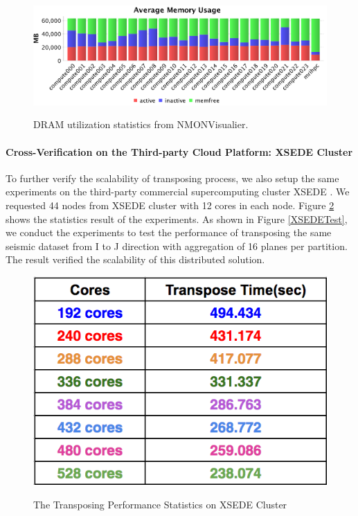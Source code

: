 \begin{figure}[h]
\centering
\includegraphics[scale=0.55]{figures/NMONMemory.png}\\
\caption{DRAM utilization statistics from NMONVisualier.}\label{NMONMEM}
\end{figure}

\paragraph{Cross-Verification on the Third-party Cloud Platform: XSEDE Cluster}

To further verify the scalability of transposing process, we also setup the same experiments on the third-party  commercial supercomputing cluster XSEDE \cite{XSEDE}. We requested 44 nodes from XSEDE cluster with 12 cores in each node. Figure \ref{XSEDETestStat} shows the statistics result of the experiments. As shown in Figure \ref{XSEDETest}, we conduct the experiments to test the performance of transposing the same seismic dataset from I to J direction with aggregation of 16 planes per partition. The result verified the scalability of this distributed solution.

\begin{figure}[h]
\centering
\includegraphics[scale=0.6]{figures/XSEDETestStat.png}\\
\caption{The Transposing Performance Statistics on XSEDE Cluster}\label{XSEDETestStat}
\end{figure}


